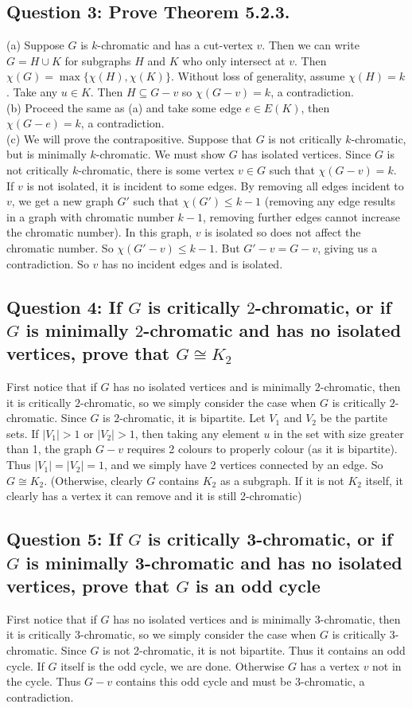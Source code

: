 \documentclass[letterpaper, 11pt]{article}
\newcommand{\1}{\mathds{1}}	%
\theoremstyle{definition}
\begin{document}
\subsection*{Question 3: Prove Theorem 5.2.3.}
(a) Suppose $G$ is $k$-chromatic and has a cut-vertex $v$. Then we can write $G = H \cup K$ for subgraphs $H$ and $K$ who only intersect at $v$. Then $\chi (G) = \max \{\chi (H), \chi (K)\}$. Without loss of generality, assume $\chi (H) = k$. Take any $u \in K$. Then $H \subseteq G - v$ so $\chi (G-v) = k$, a contradiction. ~\\ (b) Proceed the same as (a) and take some edge $e \in E(K)$, then $\chi (G- e ) = k$, a contradiction. ~\\ (c) We will prove the contrapositive. Suppose that $G$ is not critically $k$-chromatic, but is minimally $k$-chromatic. We must show $G$ has isolated vertices. Since $G$ is not critically $k$-chromatic, there is some vertex $v \in G$ such that $\chi (G-v) = k$. If $v$ is not isolated, it is incident to some edges. By removing all edges incident to $v$, we get a new graph $G'$ such that $\chi (G') \le k-1$ (removing any edge results in a graph with chromatic number $k-1$, removing further edges cannot increase the chromatic number). In this graph, $v$ is isolated so does not affect the chromatic number. So $\chi (G' - v) \le k-1$. But $G' - v = G-v$, giving us a contradiction. So $v$ has no incident edges and is isolated.

\subsection*{Question 4: If $G$ is critically $2$-chromatic, or if $G$ is minimally $2$-chromatic and has no isolated
vertices, prove that $G \cong K_2$}
First notice that if $G$ has no isolated vertices and is minimally $2$-chromatic, then it is critically $2$-chromatic, so we simply consider the case when $G$ is critically $2$-chromatic. Since $G$ is $2$-chromatic, it is bipartite. Let $V_1$ and $V_2$ be the partite sets. If $|V_1| > 1$ or $|V_2| > 1$, then taking any element $u$ in the set with size greater than 1, the graph $G - v$ requires 2 colours to properly colour (as it is bipartite). Thus $|V_1| = |V_2| = 1$, and we simply have 2 vertices connected by an edge. So $G \cong K_2$. (Otherwise, clearly $G$ contains $K_2$ as a subgraph. If it is not $K_2$ itself, it clearly has a vertex it can remove and it is still 2-chromatic)

\subsection*{Question 5: If $G$ is critically 3-chromatic, or if $G$ is minimally 3-chromatic and has no isolated
vertices, prove that $G$ is an odd cycle}
First notice that if $G$ has no isolated vertices and is minimally $3$-chromatic, then it is critically $3$-chromatic, so we simply consider the case when $G$ is critically $3$-chromatic. Since $G$ is not 2-chromatic, it is not bipartite. Thus it contains an odd cycle. If $G$ itself is the odd cycle, we are done. Otherwise $G$ has a vertex $v$ not in the cycle. Thus $G-v$ contains this odd cycle and must be 3-chromatic, a contradiction.
\end{document}

